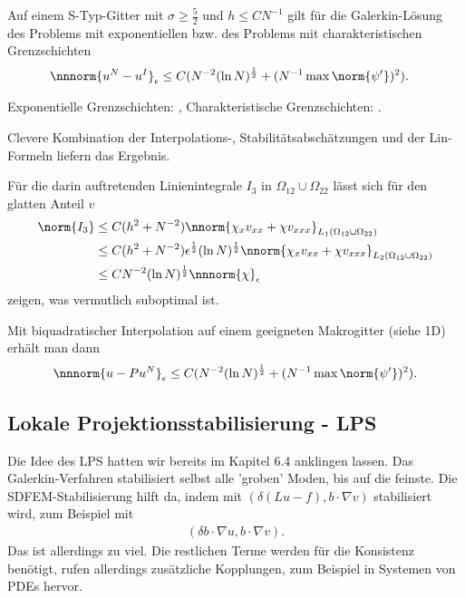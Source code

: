 \begin{satz}\label{thm:7-17}
  Auf einem S-Typ-Gitter mit $\sigma \geq \frac 52$ und $h \leq CN^{-1}$ gilt für die Galerkin-Lösung des Problems mit exponentiellen bzw. des Problems mit charakteristischen Grenzschichten
  \begin{align*}
    \nnnorm{u^{N} - u^{I}}_{\epsilon} &\leq C(N^{-2} (\ln N)^{\frac 12} + (N^{-1} \max \norm{\psi'})^{2}).  
  \end{align*}
\end{satz}
\begin{beweis}
Exponentielle Grenzschichten:  \cite{L_NMPDE},
Charakteristische Grenzschichten:  \cite{FL_NMPDE}.

Clevere Kombination der Interpolations-, Stabilitätsabschätzungen und der Lin-Formeln liefern das Ergebnis. 

Für die darin auftretenden Linienintegrale $I_{3}$ in $\Omega_{12} \cup \Omega_{22}$ lässt sich für den glatten Anteil $v$
\begin{align*}
  \norm{I_{3}} & \leq C (h^{2} + N^{-2})\nnorm{\chi_{x}v_{xx} + \chi v_{xxx}}_{L_{1}(\Omega_{12} \cup \Omega_{22})}\\
  &\leq C (h^{2} + N^{-2})\epsilon^{\frac 12} (\ln N)^{\frac 12} \nnorm{\chi_{x}v_{xx} + \chi v_{xxx}}_{L_{2}(\Omega_{12} \cup \Omega_{22})}\\
  &\leq C  N^{-2} (\ln N)^{\frac 12} \nnnorm{\chi}_{\epsilon}
\end{align*}
zeigen, was vermutlich suboptimal ist. 
\end{beweis}
Mit biquadratischer Interpolation auf einem geeigneten Makrogitter (siehe 1D) erhält man dann
\begin{align*}
  \nnnorm{u - Pu^{N}}_{\epsilon} \leq C (N^{-2}(\ln N)^{\frac 12} + (N^{-1} \max \norm{\psi'})^{2}). 
\end{align*}

\subsection{Lokale Projektionsstabilisierung - LPS}
\label{sec:lokale-proj-lps}

Die Idee des LPS hatten wir bereits im Kapitel 6.4 anklingen lassen. Das Galerkin-Verfahren stabilisiert selbst alle 'groben' Moden, bis auf die feinste. Die SDFEM-Stabilisierung hilft da, indem mit $(\delta(Lu - f), b \cdot \nabla v)$ stabilisiert wird, zum Beispiel mit
\begin{align*}
(  \delta b \cdot \nabla u, b \cdot\nabla v). 
\end{align*}
Das ist allerdings zu viel. Die restlichen Terme werden für die Konsistenz benötigt, rufen allerdings zusätzliche Kopplungen, zum Beispiel in Systemen von PDEs hervor. 

